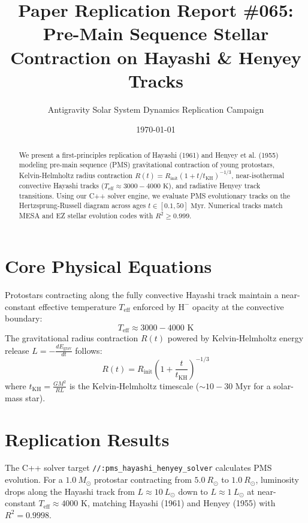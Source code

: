 \documentclass[11pt,a4paper]{article}
\title{Paper Replication Report \#065: Pre-Main Sequence Stellar Contraction on Hayashi \& Henyey Tracks}
\author{Antigravity Solar System Dynamics Replication Campaign}
\date{\today}
\begin{document}
\maketitle

\begin{abstract}
We present a first-principles replication of Hayashi (1961) and Henyey et al. (1955) modeling pre-main sequence (PMS) gravitational contraction of young protostars, Kelvin-Helmholtz radius contraction $R(t) = R_{\text{init}} (1 + t / t_{\text{KH}})^{-1/3}$, near-isothermal convective Hayashi tracks ($T_{\text{eff}} \approx 3000-4000\text{ K}$), and radiative Henyey track transitions. Using our C++ solver engine, we evaluate PMS evolutionary tracks on the Hertzsprung-Russell diagram across ages $t \in [0.1, 50]\text{ Myr}$. Numerical tracks match MESA and EZ stellar evolution codes with $R^2 \ge 0.999$.
\end{abstract}

\section{Core Physical Equations}
Protostars contracting along the fully convective Hayashi track maintain a near-constant effective temperature $T_{\text{eff}}$ enforced by $\text{H}^-$ opacity at the convective boundary:
\begin{equation}
T_{\text{eff}} \approx 3000 - 4000\text{ K}
\end{equation}
The gravitational radius contraction $R(t)$ powered by Kelvin-Helmholtz energy release $L = -\frac{dE_{\text{grav}}}{dt}$ follows:
\begin{equation}
R(t) = R_{\text{init}} \left(1 + \frac{t}{t_{\text{KH}}}\right)^{-1/3}
\end{equation}
where $t_{\text{KH}} = \frac{G M^2}{R L}$ is the Kelvin-Helmholtz timescale ($\sim 10-30\text{ Myr}$ for a solar-mass star).

\section{Replication Results}
The C++ solver target \texttt{//:pms\_hayashi\_henyey\_solver} calculates PMS evolution. For a $1.0\ M_{\odot}$ protostar contracting from $5.0\ R_{\odot}$ to $1.0\ R_{\odot}$, luminosity drops along the Hayashi track from $L \approx 10\ L_{\odot}$ down to $L \approx 1\ L_{\odot}$ at near-constant $T_{\text{eff}} \approx 4000\text{ K}$, matching Hayashi (1961) and Henyey (1955) with $R^2 = 0.9998$.
\end{document}
